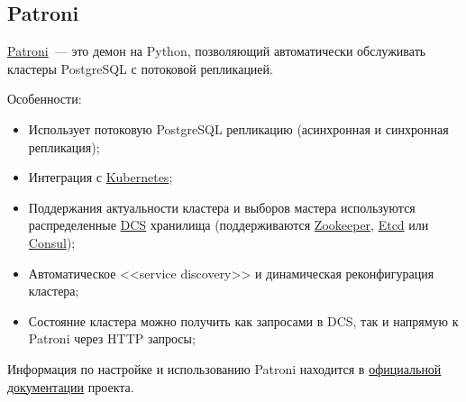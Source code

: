 \subsection{Patroni}

\href{https://github.com/zalando/patroni}{Patroni}~--- это демон на Python, позволяющий автоматически обслуживать кластеры PostgreSQL с потоковой репликацией.

Особенности:

\begin{itemize}
  \item Использует потоковую PostgreSQL репликацию (асинхронная и синхронная репликация);
  \item Интеграция с \href{https://kubernetes.io/}{Kubernetes};
  \item Поддержания актуальности кластера и выборов мастера используются распределенные \href{https://en.wikipedia.org/wiki/Distributed_control_system}{DCS} хранилища (поддерживаются \href{https://zookeeper.apache.org/}{Zookeeper}, \href{https://coreos.com/etcd}{Etcd} или \href{https://www.consul.io/}{Consul});
  \item Автоматическое <<service discovery>> и динамическая реконфигурация кластера;
  \item Состояние кластера можно получить как запросами в DCS, так и напрямую к Patroni через HTTP запросы;
\end{itemize}

Информация по настройке и использованию Patroni находится в \href{https://patroni.readthedocs.io/en/latest/}{официальной документации} проекта.
